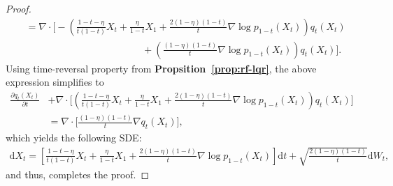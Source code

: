 \documentclass{article} %
\theoremstyle{plain}
\newcommand{\deriv}{\mathrm{d}}
\begin{document}
\begin{proof}
\begin{align*}
    & = \nabla \cdot \Bigg[-\left( \frac{1-t-\eta}{t(1-t)}X_t +\frac{\eta}{1-t}X_1 + \frac{2(1-\eta)(1-t)}{t}\nabla \log p_{1-t}(X_t)\right)q_t(X_t)\\
    &\hspace{5cm}+ \left(\frac{(1-\eta)(1-t)}{t}\nabla \log p_{1-t}(X_t)\right)q_t(X_t) \Bigg].
\end{align*}
Using time-reversal property from \textbf{Propsition~\ref{prop:rf-lqr}}, the above expression simplifies to 
\begin{align*}
    \frac{\partial q_t(X_t)}{\partial t} 
    & + \nabla \cdot \Bigg[\left( \frac{1-t-\eta}{t(1-t)}X_t +\frac{\eta}{1-t}X_1 + \frac{2(1-\eta)(1-t)}{t}\nabla \log p_{1-t}(X_t)\right)q_t(X_t) \Bigg] \\
    &= \nabla \cdot \Bigg[\frac{(1-\eta)(1-t)}{t}\nabla q_t(X_t) \Bigg], 
\end{align*}
which yields the following SDE:
\begin{align*}
    \deriv X_t = \left[ \frac{1-t-\eta}{t(1-t)}X_t +\frac{\eta}{1-t}X_1 + \frac{2(1-\eta)(1-t)}{t}\nabla \log p_{1-t}(X_t)\right] \deriv t + \sqrt{\frac{2(1-\eta)(1-t)}{t}} \deriv W_t,
\end{align*}
and thus, completes the proof.
\end{proof}
\end{document}
